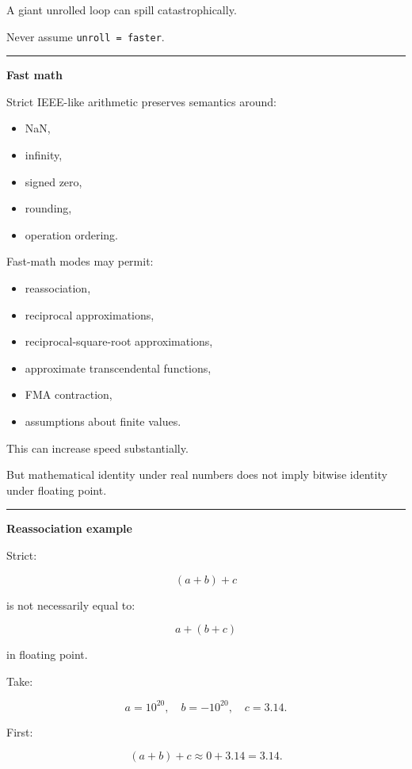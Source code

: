A giant unrolled loop can spill catastrophically.

Never assume \texttt{unroll\ =\ faster}.

\begin{center}\rule{0.5\linewidth}{0.5pt}\end{center}

\textbf{Fast math}

Strict IEEE-like arithmetic preserves semantics around:

\begin{itemize}
\tightlist
\item
  NaN,
\item
  infinity,
\item
  signed zero,
\item
  rounding,
\item
  operation ordering.
\end{itemize}

Fast-math modes may permit:

\begin{itemize}
\tightlist
\item
  reassociation,
\item
  reciprocal approximations,
\item
  reciprocal-square-root approximations,
\item
  approximate transcendental functions,
\item
  FMA contraction,
\item
  assumptions about finite values.
\end{itemize}

This can increase speed substantially.

But mathematical identity under real numbers does not imply bitwise identity under floating point.

\begin{center}\rule{0.5\linewidth}{0.5pt}\end{center}

\textbf{Reassociation example}

Strict:

\[
(a+b)+c
\]

is not necessarily equal to:

\[
a+(b+c)
\]

in floating point.

Take:

\[
a=10^{20},
\quad
b=-10^{20},
\quad
c=3.14.
\]

First:

\[
(a+b)+c
\approx
0+3.14
=
3.14.
\]

